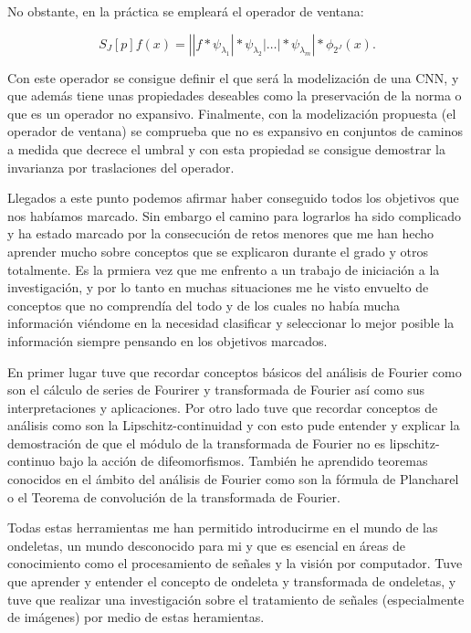 \medskip

\noindent No obstante, en la práctica se empleará el operador de ventana:

\begin{equation}
  S_J[p]f(x)=\left| |f \ast \psi_{\lambda_1} | \ast \psi_{\lambda_2} | \ldots | \ast \psi_{\lambda_m} \right| \ast \phi_{2^J}(x).
\end{equation}

\noindent Con este operador se consigue definir el que será la modelización de una CNN, y que además tiene unas propiedades deseables como la preservación de la norma o que es un operador no expansivo. Finalmente, con la modelización propuesta (el operador de ventana) se comprueba que no es expansivo en conjuntos de caminos a medida que decrece el umbral y con esta propiedad se consigue demostrar la invarianza por traslaciones del operador.

\medskip

\noindent Llegados a este punto podemos afirmar haber conseguido todos los objetivos que nos habíamos marcado. Sin embargo el camino para lograrlos ha sido complicado y ha estado marcado por la consecución de retos menores que me han hecho aprender mucho sobre conceptos que se explicaron durante el grado y otros totalmente. Es la prmiera vez que me enfrento a un trabajo de iniciación a la investigación, y por lo tanto en muchas situaciones me he visto envuelto de conceptos que no comprendía del todo y de los cuales no había mucha información viéndome en la necesidad clasificar y seleccionar lo mejor posible la información siempre pensando en los objetivos marcados. 

\medskip

\noindent En primer lugar tuve que recordar conceptos básicos del análisis de Fourier como son el cálculo de series de Fourirer y transformada de Fourier así como sus interpretaciones y aplicaciones. Por otro lado tuve que recordar conceptos de análisis como son la Lipschitz-continuidad y con esto pude entender y explicar la demostración de que el módulo de la transformada de Fourier no es lipschitz-continuo bajo la acción de difeomorfismos. También he aprendido teoremas conocidos en el ámbito del análisis de Fourier como son la fórmula de Plancharel o el Teorema de convolución de la transformada de Fourier. 

\medskip

\noindent Todas estas herramientas me han permitido introducirme en el mundo de las ondeletas, un mundo desconocido para mi y que es esencial en áreas de conocimiento como el procesamiento de señales y la visión por computador. Tuve que aprender y entender el concepto de ondeleta y transformada de ondeletas, y tuve que realizar una investigación sobre el tratamiento de señales (especialmente de imágenes) por medio de estas heramientas.

